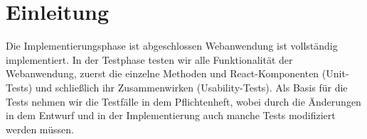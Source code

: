\section{Einleitung}
Die Implementierungsphase ist abgeschlossen Webanwendung ist vollständig implementiert. In der Testphase testen wir alle Funktionalität der Webanwendung, zuerst die einzelne Methoden und React-Komponenten (Unit-Tests) und schließlich ihr Zusammenwirken (Usability-Tests).
Als Basis für die Tests nehmen wir die Testfälle in dem Pflichtenheft, wobei durch die Änderungen in dem Entwurf und in der Implementierung auch manche Tests modifiziert werden müssen.
